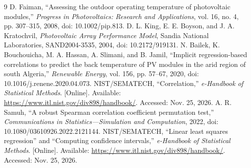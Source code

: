 \documentclass[12pt,a4paper]{article}
\begin{document}
\begin{thebibliography}{9}
 D. Faiman, ``Assessing the outdoor operating temperature of photovoltaic modules,'' \textit{Progress in Photovoltaics: Research and Applications}, vol. 16, no. 4, pp. 307--315, 2008, doi: 10.1002/pip.813.
 D. L. King, E. E. Boyson, and J. A. Kratochvil, \textit{Photovoltaic Array Performance Model}, Sandia National Laboratories, SAND2004-3535, 2004, doi: 10.2172/919131.
 N. Bailek, K. Bouchouicha, M. A. Hassan, A. Slimani, and B. Jamil, ``Implicit regression-based correlations to predict the back temperature of PV modules in the arid region of south Algeria,'' \textit{Renewable Energy}, vol. 156, pp. 57--67, 2020, doi: 10.1016/j.renene.2020.04.073.
 NIST/SEMATECH, ``Correlation,'' \textit{e-Handbook of Statistical Methods}. [Online]. Available: \url{https://www.itl.nist.gov/div898/handbook/}. Accessed: Nov. 25, 2026.
 A. R. Samuh, ``A robust Spearman correlation coefficient permutation test,'' \textit{Communications in Statistics---Simulation and Computation}, 2022, doi: 10.1080/03610926.2022.2121144.
 NIST/SEMATECH, ``Linear least squares regression'' and ``Computing confidence intervals,'' \textit{e-Handbook of Statistical Methods}. [Online]. Available: \url{https://www.itl.nist.gov/div898/handbook/}. Accessed: Nov. 25, 2026.
\end{thebibliography}
\end{document}
